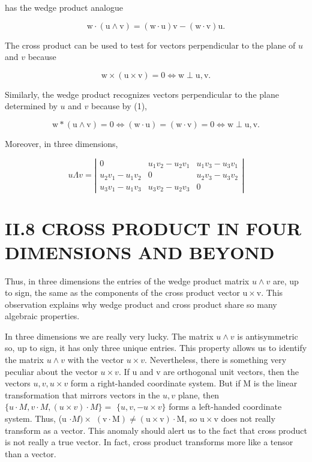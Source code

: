 \begin{CJK}{UTF8}{gbsn}
has the wedge product analogue

$$
\mathrm{w} \cdot(\mathrm{u} \wedge \mathrm{v})=(\mathrm{w} \cdot \mathrm{u}) \mathrm{v}-(\mathrm{w} \cdot \mathrm{v}) \mathrm{u} .
$$

The cross product can be used to test for vectors perpendicular to the plane of $u$ and $v$ because

$$
\mathrm{w} \times(\mathrm{u} \times \mathrm{v})=0 \Leftrightarrow \mathrm{w} \perp \mathrm{u}, \mathrm{v} .
$$

Similarly, the wedge product recognizes vectors perpendicular to the plane determined by $u$ and $v$ because by (1),

$$
\mathrm{w} *(\mathrm{u} \wedge \mathrm{v})=0 \Leftrightarrow(\mathrm{w} \cdot \mathrm{u})=(\mathrm{w} \cdot \mathrm{v})=0 \Leftrightarrow \mathrm{w} \perp \mathrm{u}, \mathrm{v} .
$$

Moreover, in three dimensions,

$$
u \Lambda v=\left|\begin{array}{ccc}
0 & u_{1} v_{2}-u_{2} v_{1} & u_{1} v_{3}-u_{3} v_{1} \\
u_{2} v_{1}-u_{1} v_{2} & 0 & u_{2} v_{3}-u_{3} v_{2} \\
u_{3} v_{1}-u_{1} v_{3} & u_{3} v_{2}-u_{2} v_{3} & 0
\end{array}\right|
$$

\section{II.8 CROSS PRODUCT IN FOUR DIMENSIONS AND BEYOND}
Thus, in three dimensions the entries of the wedge product matrix $u \wedge v$ are, up to sign, the same as the components of the cross product vector $\mathrm{u} \times \mathrm{v}$. This observation explains why wedge product and cross product share so many algebraic properties.

In three dimensions we are really very lucky. The matrix $u \wedge v$ is antisymmetric so, up to sign, it has only three unique entries. This property allows us to identify the matrix $u \wedge v$ with the vector $u \times v$. Nevertheless, there is something very peculiar about the vector $u \times v$. If $\mathrm{u}$ and $\mathrm{v}$ are orthogonal unit vectors, then the vectors $u, v, u \times v$ form a right-handed coordinate system. But if $\mathrm{M}$ is the linear transformation that mirrors vectors in the $u, v$ plane, then $\{u \cdot M, v \cdot M,(u \times v) \cdot M\}=$ $\{u, v,-u \times v\}$ forms a left-handed coordinate system. Thus, (u $\cdot M) \times$ $(\mathrm{v} \cdot \mathrm{M}) \neq(\mathrm{u} \times \mathrm{v}) \cdot \mathrm{M}$, so $\mathrm{u} \times \mathrm{v}$ does not really transform as a vector. This anomaly should alert us to the fact that cross product is not really a true vector. In fact, cross product transforms more like a tensor than a vector.


\end{CJK}
